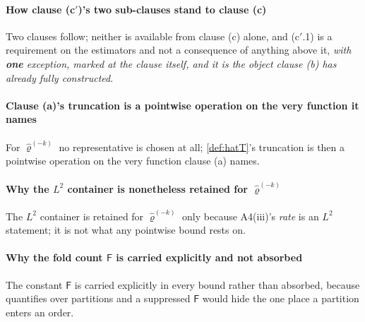 \paragraph{How clause \textup{(c$'$)}'s two sub-clauses stand to clause \textup{(c)}}

Two clauses follow; neither is available from clause \textup{(c)} alone, and
\textup{(c$'$.1)} is a requirement on the estimators and not a consequence of anything above it, 
\emph{with \textbf{one} exception, marked at the clause itself, and it is the object clause \textup{(b)} has
already fully constructed}.

\paragraph{Clause \textup{(a)}'s truncation is a pointwise operation on the very function it names}

For $\hat\varrho^{(-k)}$ no representative is chosen at all; \cref{def:hatT}'s truncation is then a pointwise operation on the very
function clause \textup{(a)} names.

\paragraph{Why the $L^{2}$ container is nonetheless retained for $\hat\varrho^{(-k)}$}

The $L^{2}$ container is retained
for $\hat\varrho^{(-k)}$ only because A4(iii)'s \emph{rate} is an $L^{2}$ statement; it is not what any
pointwise bound rests on.

\paragraph{Why the fold count $\mathsf F$ is carried explicitly and not absorbed}

The constant $\mathsf F$ is carried explicitly in every bound rather than absorbed, because
 quantifies over partitions and a suppressed $\mathsf F$ would hide
the one place a partition enters an order.
